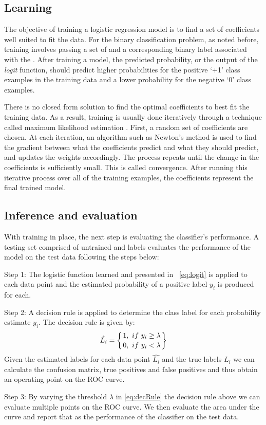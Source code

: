 \subsection{Learning}
The objective of training a logistic regression model is to find a set of coefficients well suited to fit the data. For the binary classification problem,  as noted before, training involves passing a set of \cov and a corresponding binary label associated with the \cov. After training a model, the predicted probability, or the output of the \textit{logit} function, should predict higher probabilities for the positive `+1' class examples in the training data and a lower probability for the negative `0' class examples. 

There is no closed form solution to find the optimal coefficients to best fit the training data. As a result, training is usually done iteratively through a technique called maximum likelihood estimation \cite{menard2002applied}. First, a random set of coefficients are chosen. At each iteration, an algorithm such as Newton's method is used to find the gradient between what the coefficients predict and what they should predict, and updates the weights accordingly. The process repeats until the change in the coefficients is sufficiently small. This is called convergence. After running this iterative process over all of the training examples, the coefficients represent the final trained model.

\subsection{Inference and evaluation}
With training in place, the next step is evaluating the classifier's performance. A testing set comprised of untrained \cov and labels evaluates the performance of the model on the test data following the steps below: 
\begin{description}\label{steps}
\item {Step 1:} The logistic function learned and presented in ~\ref{eq:logit} is applied to each data point and the estimated probability of a positive label $y_i$ is produced for each.

\item {Step 2:}  A decision rule is applied to determine the class label for each probability estimate $y_i$. The decision rule is given by: 
\begin{equation}\label{eq:decRule}
\hat {L_i} = \left\{ 1, \ if \ y_i \geq \lambda \atop 0, \ if \ y_i < \lambda \right\}
\end{equation}
Given the estimated labels for each data point $\hat{L_i}$ and the true labels $L_i$ we can calculate the confusion matrix, true positives and false positives and thus obtain an operating point on the ROC curve. 
\item {Step 3:} By varying the threshold $\lambda$ in \ref{eq:decRule} the decision rule above we can evaluate multiple points on the ROC curve. We then evaluate the area under the curve and report that as the performance of the classifier on the test data.
\end{description}

